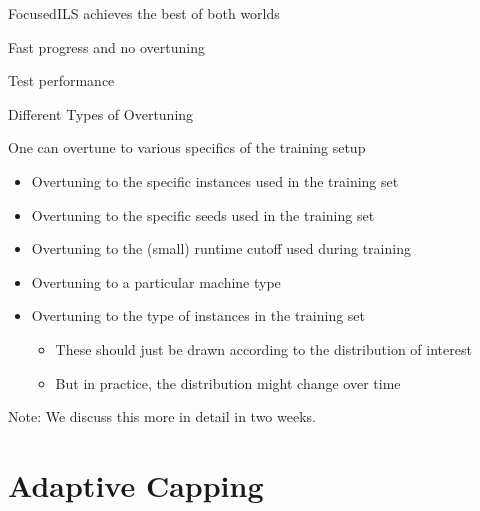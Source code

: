 \begin{frame}[fragile]{FocusedILS achieves the best of both worlds}

Fast progress and no overtuning

\begin{center}
Test performance\\
\end{center}

\end{frame}



\begin{frame}[c,fragile]{Different Types of Overtuning}

One can overtune to various specifics of the training setup
\begin{itemize}
	\item Overtuning to the specific instances used in the training set 
	\item Overtuning to the specific seeds used in the training set
\pause
	\item Overtuning to the (small) runtime cutoff used during training 
	\item Overtuning to a particular machine type
\pause
	\item Overtuning to the type of instances in the training set
	\begin{itemize}
	  \item These should just be drawn according to the distribution of interest
	  \item But in practice, the distribution might change over time 
	\end{itemize}	 
\end{itemize}	

\pause
\bigskip
Note: We discuss this more in detail in two weeks. 

\end{frame}


\section{Adaptive Capping}


